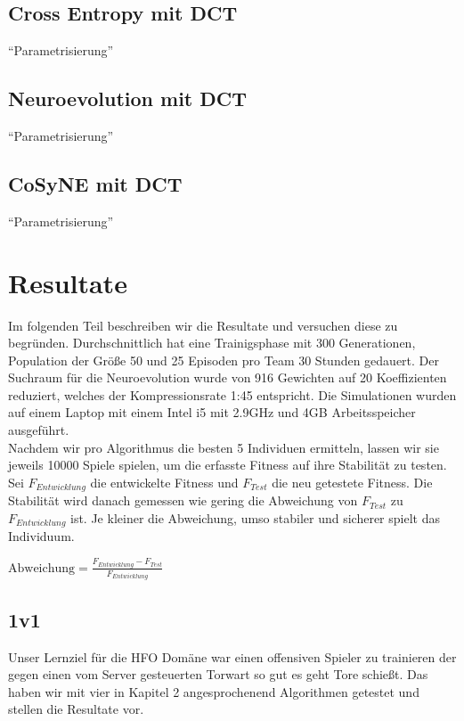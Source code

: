         \subsection{Cross Entropy mit DCT}
            ``Parametrisierung''
        \subsection{Neuroevolution mit DCT}
            ``Parametrisierung''
        \subsection{CoSyNE mit DCT}
            ``Parametrisierung''

    \section{Resultate}
        Im folgenden Teil beschreiben wir die Resultate und versuchen diese zu begründen. Durchschnittlich hat eine Trainigsphase mit 300 Generationen, Population der Größe 50 und 25 Episoden pro Team 30 Stunden gedauert. Der Suchraum für die Neuroevolution wurde von 916 Gewichten auf 20 Koeffizienten reduziert, welches der Kompressionsrate 1:45 entspricht. Die Simulationen wurden auf einem Laptop mit einem Intel i5 mit 2.9GHz und 4GB Arbeitsspeicher ausgeführt.\\[2mm]
        \noindent
        Nachdem wir pro Algorithmus die besten 5 Individuen ermitteln, lassen wir sie jeweils 10000 Spiele spielen, um die erfasste Fitness auf ihre Stabilität zu testen. \\[2mm]
        \noindent
        Sei $F_{Entwicklung}$ die entwickelte Fitness und $F_{Test}$ die neu getestete Fitness. Die Stabilität wird danach gemessen wie gering die Abweichung von $F_{Test}$ zu $F_{Entwicklung}$ ist. Je kleiner die Abweichung, umso stabiler und sicherer spielt das Individuum.\\

        \begin{center}
            \begin{math}
                \text{Abweichung} = \frac{F_{Entwicklung} - F_{Test}}{F_{Entwicklung}}
            \end{math}
        \end{center}

        \subsection{1v1}
            Unser Lernziel für die HFO Domäne war einen offensiven Spieler zu trainieren der gegen einen vom Server gesteuerten Torwart so gut es geht Tore schießt. Das haben wir mit vier in Kapitel 2 angesprochenend Algorithmen getestet und stellen die Resultate vor. 

